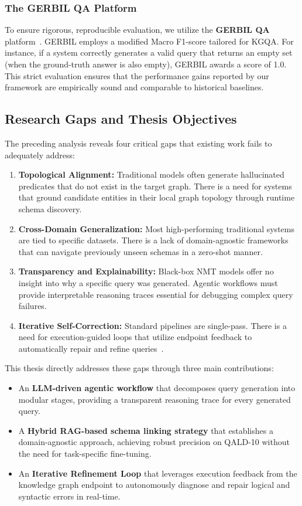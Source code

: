 \subsubsection{The GERBIL QA Platform}
To ensure rigorous, reproducible evaluation, we utilize the \textbf{GERBIL QA} platform~\cite{usbeck2019benchmarking, usbeck2019gerbilqa}. GERBIL employs a modified Macro F1-score tailored for KGQA. For instance, if a system correctly generates a valid query that returns an empty set (when the ground-truth answer is also empty), GERBIL awards a score of 1.0. This strict evaluation ensures that the performance gains reported by our framework are empirically sound and comparable to historical baselines.

\subsection{Research Gaps and Thesis Objectives}
\label{sec:research_gaps}
The preceding analysis reveals four critical gaps that existing work fails to adequately address:

\begin{enumerate}
    \item \textbf{Topological Alignment:} Traditional models often generate hallucinated predicates that do not exist in the target graph. There is a need for systems that ground candidate entities in their local graph topology through runtime schema discovery.
    \item \textbf{Cross-Domain Generalization:} Most high-performing traditional systems are tied to specific datasets. There is a lack of domain-agnostic frameworks that can navigate previously unseen schemas in a zero-shot manner.
    \item \textbf{Transparency and Explainability:} Black-box NMT models offer no insight into why a specific query was generated. Agentic workflows must provide interpretable reasoning traces essential for debugging complex query failures.
    \item \textbf{Iterative Self-Correction:} Standard pipelines are single-pass. There is a need for execution-guided loops that utilize endpoint feedback to automatically repair and refine queries~\cite{zhao_agentict2srobust_2025}.
\end{enumerate}

This thesis directly addresses these gaps through three main contributions:
\begin{itemize}
    \item An \textbf{LLM-driven agentic workflow} that decomposes query generation into modular stages, providing a transparent reasoning trace for every generated query.
    \item A \textbf{Hybrid RAG-based schema linking strategy} that establishes a domain-agnostic approach, achieving robust precision on QALD-10 without the need for task-specific fine-tuning.
    \item An \textbf{Iterative Refinement Loop} that leverages execution feedback from the knowledge graph endpoint to autonomously diagnose and repair logical and syntactic errors in real-time.
\end{itemize}

